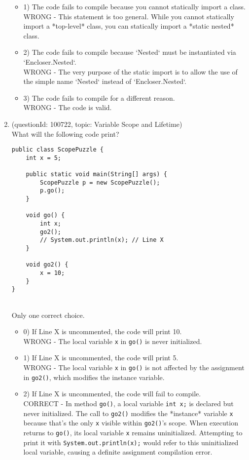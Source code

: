 \documentclass[12pt]{article}
\begin{document}
\begin{enumerate}[label=(\arabic*)]
\begin{itemize}
\item 1) The code fails to compile because you cannot statically import a class.
 \\ 
WRONG - This statement is too general. While you cannot statically import a *top-level* class, you can statically import a *static nested* class.

\item 2) The code fails to compile because `Nested` must be instantiated via `Encloser.Nested`.
 \\ 
WRONG - The very purpose of the static import is to allow the use of the simple name `Nested` instead of `Encloser.Nested`.

\item 3) The code fails to compile for a different reason.
 \\ 
WRONG - The code is valid.

\end{itemize}
\item (questionId: 100722, topic: Variable Scope and Lifetime) \\ 
What will the following code print?\n\begin{verbatim}
public class ScopePuzzle {
    int x = 5;

    public static void main(String[] args) {
        ScopePuzzle p = new ScopePuzzle();
        p.go();
    }

    void go() {
        int x;
        go2();
        // System.out.println(x); // Line X
    }

    void go2() {
        x = 10;
    }
}
\end{verbatim}
\\ \noindent Only one correct choice. 
\begin{itemize}
\item 0) If Line X is uncommented, the code will print 10.
 \\ 
WRONG - The local variable \verb|x| in \verb|go()| is never initialized.

\item 1) If Line X is uncommented, the code will print 5.
 \\ 
WRONG - The local variable \verb|x| in \verb|go()| is not affected by the assignment in \verb|go2()|, which modifies the instance variable.

\item 2) If Line X is uncommented, the code will fail to compile.
 \\ 
CORRECT - In method \verb|go()|, a local variable \verb|int x;| is declared but never initialized. The call to \verb|go2()| modifies the *instance* variable \verb|x| because that's the only \verb|x| visible within \verb|go2()|'s scope. When execution returns to \verb|go()|, its local variable \verb|x| remains uninitialized. Attempting to print it with \verb|System.out.println(x);| would refer to this uninitialized local variable, causing a definite assignment compilation error.


\end{itemize}
\end{enumerate}
\end{document}
